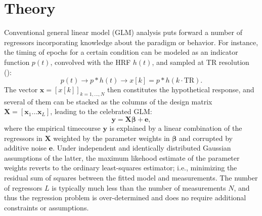 
\section{Theory}


Conventional general linear model (GLM) analysis puts forward a number of regressors incorporating knowledge about the paradigm or behavior. For instance, the timing of epochs for a certain condition can be modeled as an indicator function $p(t)$, convolved with the HRF $h(t)$, and sampled at TR resolution (\citealt{friston1994analysis, friston1998event, boynton1996linear, cohen1997parametric}):
$$
   p(t) \rightarrow p*h(t) \rightarrow x[k] = p*h(k\cdot\text{TR}).
$$
The vector $\mathbf{x}=[x[k]]_{k=1,\ldots,N}$ then constitutes the hypothetical response, and several of them can be stacked as the columns of the design matrix $\mathbf{X}=[\mathbf{x}_1 \ldots \mathbf{x}_L]$, leading to the celebrated GLM: 
\begin{equation}
    \label{eq:glm}
    \mathbf{y} = \mathbf{X \beta} + \mathbf{e},
\end{equation}
where the empirical timecourse $\mathbf{y}$ is explained by a linear combination of the regressors in $\mathbf{X}$ weighted by the parameter weights in $\mathbf{\beta}$ and corrupted by additive noise $\mathbf{e}$. Under independent and identically distributed Gaussian assumptions of the latter, the maximum likehood estimate of the parameter weights reverts to the ordinary least-squares estimator; i.e., minimizing the residual sum of squares between the fitted model and measurements. The number of regressors $L$ is typically much less than the number of measurements $N$, and thus the regression problem is over-determined and does no require additional constraints or assumptions.

